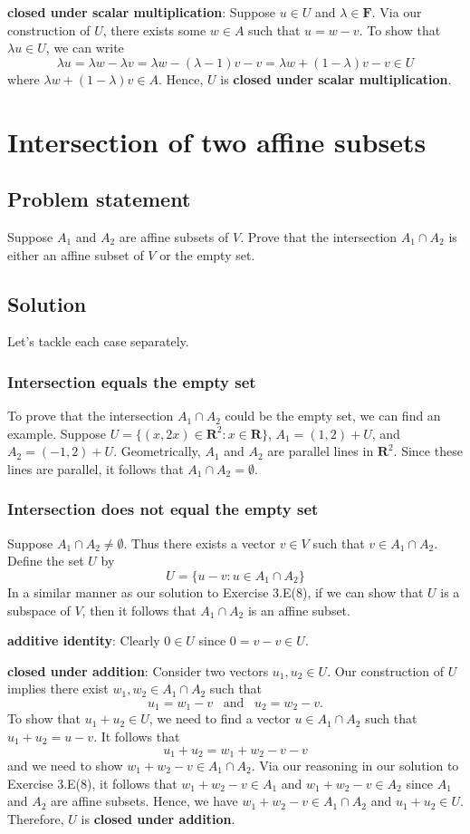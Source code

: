 \documentclass{article}
\begin{document}
\textbf{closed under scalar multiplication}: Suppose $u\in U$ and $\lambda\in\mathbf{F}$. 
Via our construction of $U$, there exists some $w\in A$ such that $u=w-v$. 
To show that $\lambda u\in U$, we can write
\[\lambda u=\lambda w - \lambda v=\lambda w - (\lambda -1)v-v=\lambda w+(1-\lambda)v-v\in U\]
where $\lambda w+(1-\lambda)v\in A$. Hence, $U$ is \textbf{closed under scalar multiplication}.

\clearpage

\section{Intersection of two affine subsets}
\subsection*{Problem statement}
Suppose $A_1$ and $A_2$ are affine subsets of $V$. 
Prove that the intersection $A_1\cap A_2$ is either an affine subset of $V$ or the empty set.

\subsection*{Solution}
Let's tackle each case separately.

\subsubsection*{Intersection equals the empty set}
To prove that the intersection $A_1\cap A_2$ could be the empty set, we can find an example. 
Suppose $U=\{(x,2x)\in\mathbf{R}^2:x\in\mathbf{R}\}$, $A_1=(1,2)+U$, and $A_2=(-1,2)+U$. 
Geometrically, $A_1$ and $A_2$ are parallel lines in $\mathbf{R}^2$. 
Since these lines are parallel, it follows that $A_1\cap A_2=\emptyset$.

\subsubsection*{Intersection does not equal the empty set}
Suppose $A_1\cap A_2\neq\emptyset$. 
Thus there exists a vector $v\in V$ such that $v\in A_1\cap A_2$. 
Define the set $U$ by 
\[U=\{u-v:u\in A_1\cap A_2\}\]
In a similar manner as our solution to Exercise 3.E(8), if we can show that $U$ is a subspace of $V$, then it follows that $A_1\cap A_2$ is an affine subset. 

\textbf{additive identity}: Clearly $0\in U$ since $0=v-v\in U$.

\textbf{closed under addition}: Consider two vectors $u_1,u_2\in U$. 
Our construction of $U$ implies there exist $w_1,w_2\in A_1\cap A_2$ such that
\[u_1=w_1-v\;\;\;\text{and}\;\;\;u_2=w_2-v.\]
To show that $u_1+u_2\in U$, we need to find a vector $u\in  A_1\cap A_2$ such \newline that $u_1+u_2=u-v$. 
It follows that
\[u_1+u_2=w_1+w_2-v-v\]
and we need to show $w_1+w_2-v\in  A_1\cap A_2$. 
Via our reasoning in our solution to Exercise 3.E(8), it follows that $w_1+w_2-v\in A_1$ and $w_1+w_2-v\in A_2$ since $A_1$ and $A_2$ are affine subsets. 
Hence, we have $w_1+w_2-v\in  A_1\cap A_2$ and $u_1+u_2\in U$. 
Therefore,  $U$ is \textbf{closed under addition}.
\end{document}
